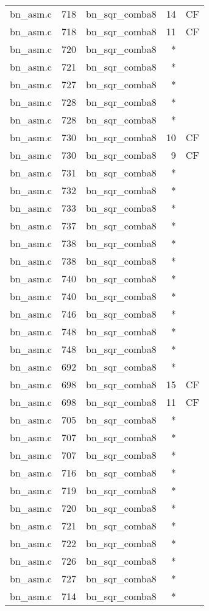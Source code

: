 \begin{table}[h!]
\begin{tabular}{lrlrr}
bn\_asm.c& 718&bn\_sqr\_comba8&14&CF\\
bn\_asm.c& 718&bn\_sqr\_comba8&11&CF\\
bn\_asm.c& 720&bn\_sqr\_comba8&*&\\
bn\_asm.c& 721&bn\_sqr\_comba8&*&\\
bn\_asm.c& 727&bn\_sqr\_comba8&*&\\
bn\_asm.c& 728&bn\_sqr\_comba8&*&\\
bn\_asm.c& 728&bn\_sqr\_comba8&*&\\
bn\_asm.c& 730&bn\_sqr\_comba8&10&CF\\
bn\_asm.c& 730&bn\_sqr\_comba8&9 &CF\\
bn\_asm.c& 731&bn\_sqr\_comba8&*&\\
bn\_asm.c& 732&bn\_sqr\_comba8&*&\\
bn\_asm.c& 733&bn\_sqr\_comba8&*&\\
bn\_asm.c& 737&bn\_sqr\_comba8&*&\\
bn\_asm.c& 738&bn\_sqr\_comba8&*&\\
bn\_asm.c& 738&bn\_sqr\_comba8&*&\\
bn\_asm.c& 740&bn\_sqr\_comba8&*&\\
bn\_asm.c& 740&bn\_sqr\_comba8&*&\\
bn\_asm.c& 746&bn\_sqr\_comba8&*&\\
bn\_asm.c& 748&bn\_sqr\_comba8&*&\\
bn\_asm.c& 748&bn\_sqr\_comba8&*&\\
bn\_asm.c& 692&bn\_sqr\_comba8&*&\\
bn\_asm.c& 698&bn\_sqr\_comba8&15&CF\\
bn\_asm.c& 698&bn\_sqr\_comba8&11&CF\\
bn\_asm.c& 705&bn\_sqr\_comba8&*&\\
bn\_asm.c& 707&bn\_sqr\_comba8&*&\\
bn\_asm.c& 707&bn\_sqr\_comba8&*&\\
bn\_asm.c& 716&bn\_sqr\_comba8&*&\\
bn\_asm.c& 719&bn\_sqr\_comba8&*&\\
bn\_asm.c& 720&bn\_sqr\_comba8&*&\\
bn\_asm.c& 721&bn\_sqr\_comba8&*&\\
bn\_asm.c& 722&bn\_sqr\_comba8&*&\\
bn\_asm.c& 726&bn\_sqr\_comba8&*&\\
bn\_asm.c& 727&bn\_sqr\_comba8&*&\\
bn\_asm.c& 714&bn\_sqr\_comba8&*&\\

\end{tabular}
\end{table}
